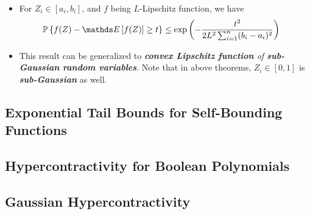 \documentclass[11pt]{article}
\begin{document}
\begin{itemize}
\item \begin{remark}
For $Z_i \in [a_i, b_i]$, and $f$ being $L$-Lipschitz function, we have
\begin{align*}
\bP\set{f(Z) - \E{}{f(Z)} \ge t } &\le \exp\paren{- \frac{t^2}{2L^2\sum_{i=1}^n(b_i - a_i)^2}}
\end{align*}
\end{remark}

\item \begin{remark}
This result can be generalized to \emph{\textbf{convex Lipschitz function} of \textbf{sub-Gaussian random variables}}. Note that in above theorems, $Z_i \in [0, 1]$ is \emph{\textbf{sub-Gaussian}} as well. 
\end{remark}
\end{itemize}

\subsection{Exponential Tail Bounds for Self-Bounding Functions}

\subsection{Hypercontractivity for Boolean Polynomials}
\subsection{Gaussian Hypercontractivity}



\newpage


\end{document}
